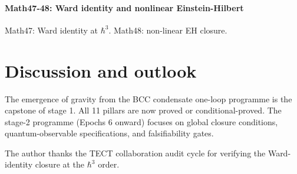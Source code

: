 \paragraph{Math47-48: Ward identity and nonlinear Einstein-Hilbert}
Math47: Ward identity at $\hbar^3$. Math48: non-linear EH closure. \cite{Math47, Math48}

\section{Discussion and outlook}
The emergence of gravity from the BCC condensate one-loop programme is the capstone of
stage 1. All 11 pillars are now proved or conditional-proved. The stage-2 programme
(Epochs 6 onward) focuses on global closure conditions, quantum-observable specifications,
and falsifiability gates.

\begin{acknowledgments}
The author thanks the TECT collaboration audit cycle for verifying the Ward-identity closure at the $\hbar^3$ order.
\end{acknowledgments}






